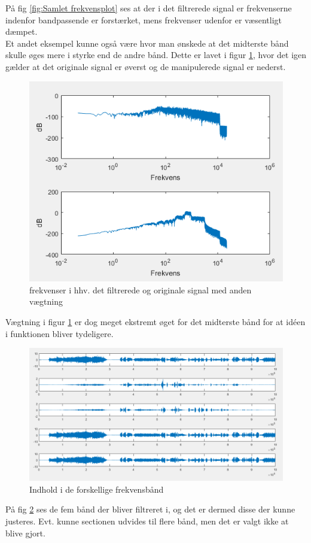 På fig \ref{fig:Samlet frekvensplot} ses at der i det filtrerede signal er frekvenserne indenfor bandpassende er forstærket, mens frekvenser udenfor er væsentligt dæmpet.\\

Et andet eksempel kunne også være hvor man ønskede at det midterste bånd skulle øges mere i styrke end de andre bånd. Dette er lavet i figur \ref{fig:Samlet frekvensplot manipuleret}, hvor det igen gælder at det originale signal er øverst og de manipulerede signal er nederst.

\begin{figure}[H]
	\centering
	\includegraphics[width=150mm]{figures/hoereapparat_resultat_forskelligvaegt.PNG}
	\caption{frekvenser i hhv. det filtrerede og originale signal med anden vægtning}
	\label{fig:Samlet frekvensplot manipuleret}
\end{figure}

Vægtning i figur \ref{fig:Samlet frekvensplot manipuleret} er dog meget ekstremt øget for det midterste bånd for at idéen i funktionen bliver tydeligere.


\begin{figure}[H]
	\centering
	\includegraphics[width=150mm]{figures/indhold_i_band.PNG}
	\caption{Indhold i de forskellige frekvensbånd}
	\label{fig:indholdiband}
\end{figure}


På fig \ref{fig:indholdiband} ses de fem bånd der bliver filtreret i, og det er dermed disse der kunne justeres. Evt. kunne sectionen udvides til flere bånd, men det er valgt ikke at blive gjort. 

